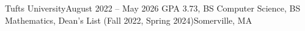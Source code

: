 \resumeSubHeadingListStart
    \resumeSubheading
      {Tufts University}{August 2022 – May 2026}
    {GPA 3.73, BS Computer Science, BS Mathematics, Dean's List (Fall 2022,
    Spring 2024)}{Somerville, MA}
      

  \resumeSubHeadingListEnd